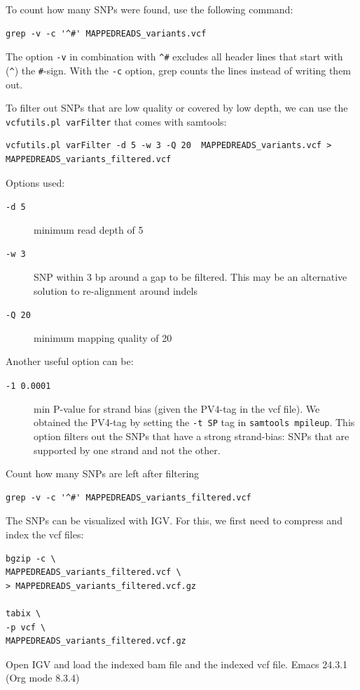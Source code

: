 \documentclass[11pt]{article}
\begin{document}
To count how many SNPs were found, use the following command:

\begin{verbatim}
grep -v -c '^#' MAPPEDREADS_variants.vcf
\end{verbatim}

The option \texttt{-v} in combination with \texttt{\textasciicircum{}\#} excludes all header lines
that start with (\texttt{\textasciicircum{}}) the \texttt{\#}-sign. With the \texttt{-c} option, grep counts
the lines instead of writing them out.


To filter out SNPs that are low quality or covered by low depth, we
can use the \texttt{vcfutils.pl varFilter} that comes with samtools:

\begin{verbatim}
vcfutils.pl varFilter -d 5 -w 3 -Q 20  MAPPEDREADS_variants.vcf > MAPPEDREADS_variants_filtered.vcf
\end{verbatim}


Options used:
\begin{description}
\item[{\texttt{-d 5}}] minimum read depth of 5
\item[{\texttt{-w 3}}] SNP within 3 bp around a gap to be filtered. This may be
an alternative solution to re-alignment around indels
\item[{\texttt{-Q 20}}] minimum mapping quality of 20
\end{description}

Another useful option can be:
\begin{description}
\item[{\texttt{-1 0.0001}}] min P-value for strand bias (given the PV4-tag in the
vcf file). We obtained the PV4-tag by setting the \texttt{-t SP} tag in
\texttt{samtools mpileup}. This option filters out the SNPs that have a
strong strand-bias: SNPs that are supported by one strand and not
the other.
\end{description}


Count how many SNPs are left after filtering

\begin{verbatim}
grep -v -c '^#' MAPPEDREADS_variants_filtered.vcf
\end{verbatim}

The SNPs can be visualized with IGV. For this, we first need to
compress and index the vcf files: 

\begin{verbatim}
bgzip -c \
MAPPEDREADS_variants_filtered.vcf \
> MAPPEDREADS_variants_filtered.vcf.gz

tabix \
-p vcf \
MAPPEDREADS_variants_filtered.vcf.gz
\end{verbatim}

Open IGV and load the indexed bam file and the indexed vcf file.
Emacs 24.3.1 (Org mode 8.3.4)
\end{document}
